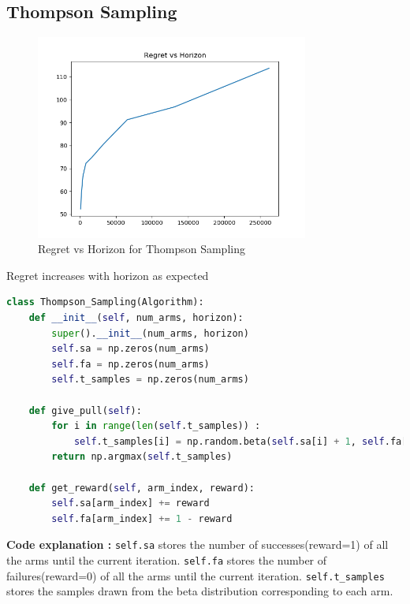\documentclass[11pt]{article}
\begin{document}
\subsection*{Thompson Sampling}
 \begin{figure}[H]
    \begin{center}
        \includegraphics[width=0.8\textwidth]{../images/task1-Thompson_Sampling-20230907-232753.png}
        
        \caption{Regret vs Horizon for Thompson Sampling}
    \end{center}
 \end{figure}
 Regret increases with horizon as expected 

 \begin{lstlisting}[language=Python]      
    class Thompson_Sampling(Algorithm):
    def __init__(self, num_arms, horizon):
        super().__init__(num_arms, horizon)
        self.sa = np.zeros(num_arms)
        self.fa = np.zeros(num_arms)
        self.t_samples = np.zeros(num_arms)
    
    def give_pull(self):
        for i in range(len(self.t_samples)) :
            self.t_samples[i] = np.random.beta(self.sa[i] + 1, self.fa[i] + 1)
        return np.argmax(self.t_samples)
    
    def get_reward(self, arm_index, reward):
        self.sa[arm_index] += reward
        self.fa[arm_index] += 1 - reward        \end{lstlisting}
    
\noindent
\textbf{Code explanation :} \texttt{self.sa} stores the number of successes(reward=1) of 
all the arms until the current iteration. \texttt{self.fa} stores the number of failures(reward=0) of 
all the arms until the current iteration. \texttt{self.t\_samples} stores 
the samples drawn from the beta distribution corresponding to each arm. 
\end{document}

